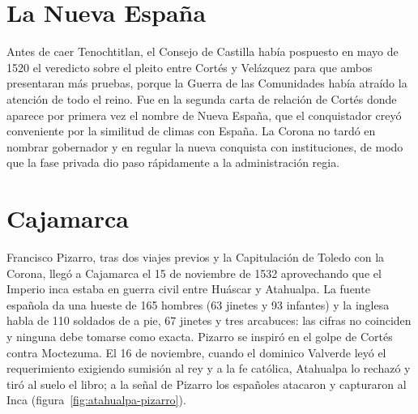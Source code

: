 \documentclass{book}
\begin{document}
\section{La Nueva España}

Antes de caer Tenochtitlan, el Consejo de Castilla había pospuesto en mayo de 1520 el veredicto sobre el pleito entre Cortés y Velázquez para que ambos presentaran más pruebas, porque la Guerra de las Comunidades había atraído la atención de todo el reino. Fue en la segunda carta de relación de Cortés donde aparece por primera vez el nombre de Nueva España, que el conquistador creyó conveniente por la similitud de climas con España. La Corona no tardó en nombrar gobernador y en regular la nueva conquista con instituciones, de modo que la fase privada dio paso rápidamente a la administración regia.


\section{Cajamarca}

Francisco Pizarro, tras dos viajes previos y la Capitulación de Toledo con la Corona, llegó a Cajamarca el 15 de noviembre de 1532 aprovechando que el Imperio inca estaba en guerra civil entre Huáscar y Atahualpa. La fuente española da una hueste de 165 hombres (63 jinetes y 93 infantes) y la inglesa habla de 110 soldados de a pie, 67 jinetes y tres arcabuces: las cifras no coinciden y ninguna debe tomarse como exacta. Pizarro se inspiró en el golpe de Cortés contra Moctezuma. El 16 de noviembre, cuando el dominico Valverde leyó el requerimiento exigiendo sumisión al rey y a la fe católica, Atahualpa lo rechazó y tiró al suelo el libro; a la señal de Pizarro los españoles atacaron y capturaron al Inca (figura~\ref{fig:atahualpa-pizarro}).

\end{document}
